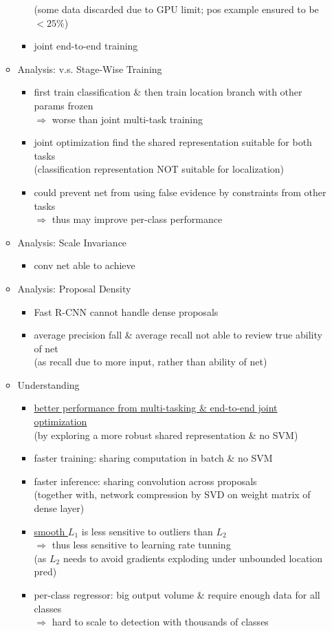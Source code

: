 \begin{itemize}
\begin{itemize}
\begin{itemize}
		(some data discarded due to GPU limit; pos example ensured to be $< 25\%$)
		\item joint end-to-end training
		\end{itemize}
	\item Analysis: v.s. Stage-Wise Training
		\begin{itemize}
		\item first train classification \& then train location branch with other params frozen \\ 
		$\Rightarrow$ worse than joint multi-task training
		\item joint optimization find the shared representation suitable for both tasks \\
		(classification representation NOT suitable for localization)
		\item could prevent net from using false evidence by constraints from other tasks \\
		$\Rightarrow$ thus may improve per-class performance
		\end{itemize}
	\item Analysis: Scale Invariance
		\begin{itemize}
		\item conv net able to achieve 
		\end{itemize}
	\item Analysis: Proposal Density
		\begin{itemize}
		\item Fast R-CNN cannot handle dense proposals
		\item average precision fall \& average recall not able to review true ability of net \\
		(as recall due to more input, rather than ability of net)
		\end{itemize}
	\item Understanding
		\begin{itemize}
		\item \underline{better performance from multi-tasking \& end-to-end joint optimization} \\
		(by exploring a more robust shared representation \& no SVM)
		\item faster training: sharing computation in batch \& no SVM
		\item faster inference: sharing convolution across proposals \\
		(together with, network compression by SVD on weight matrix of dense layer)
		\item \underline{smooth $L_1$} is less sensitive to outliers than $L_2$ \\
		$\Rightarrow$ thus less sensitive to learning rate tunning \\
		(as $L_2$ needs to avoid gradients exploding under unbounded location pred)
		\item per-class regressor: big output volume \& require enough data for all classes \\
		$\Rightarrow$ hard to scale to detection with thousands of classes
		\end{itemize}
	\end{itemize}


\end{itemize}
